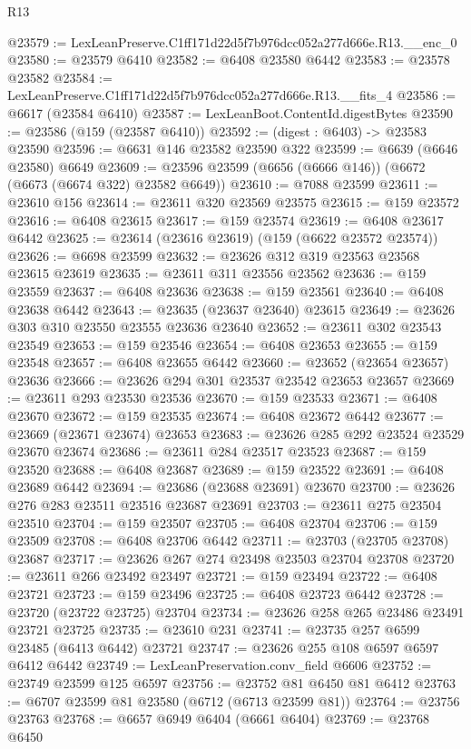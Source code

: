 \begin{lexlean}{R13}
\begin{coremodule}
@23579 := LexLeanPreserve.C1ff171d22d5f7b976dcc052a277d666e.R13.__enc_0
@23580 := @23579 @6410
@23582 := @6408 @23580 @6442
@23583 := @23578 @23582
@23584 := LexLeanPreserve.C1ff171d22d5f7b976dcc052a277d666e.R13.__fits_4
@23586 := @6617 (@23584 @6410)
@23587 := LexLeanBoot.ContentId.digestBytes
@23590 := @23586 (@159 (@23587 @6410))
@23592 := (digest : @6403) -> @23583 @23590
@23596 := @6631 @146 @23582 @23590 @322
@23599 := @6639 (@6646 @23580) @6649
@23609 := @23596 @23599 (@6656 (@6666 @146)) (@6672 (@6673 (@6674 @322) @23582 @6649))
@23610 := @7088 @23599
@23611 := @23610 @156
@23614 := @23611 @320 @23569 @23575
@23615 := @159 @23572
@23616 := @6408 @23615
@23617 := @159 @23574
@23619 := @6408 @23617 @6442
@23625 := @23614 (@23616 @23619) (@159 (@6622 @23572 @23574))
@23626 := @6698 @23599
@23632 := @23626 @312 @319 @23563 @23568 @23615 @23619
@23635 := @23611 @311 @23556 @23562
@23636 := @159 @23559
@23637 := @6408 @23636
@23638 := @159 @23561
@23640 := @6408 @23638 @6442
@23643 := @23635 (@23637 @23640) @23615
@23649 := @23626 @303 @310 @23550 @23555 @23636 @23640
@23652 := @23611 @302 @23543 @23549
@23653 := @159 @23546
@23654 := @6408 @23653
@23655 := @159 @23548
@23657 := @6408 @23655 @6442
@23660 := @23652 (@23654 @23657) @23636
@23666 := @23626 @294 @301 @23537 @23542 @23653 @23657
@23669 := @23611 @293 @23530 @23536
@23670 := @159 @23533
@23671 := @6408 @23670
@23672 := @159 @23535
@23674 := @6408 @23672 @6442
@23677 := @23669 (@23671 @23674) @23653
@23683 := @23626 @285 @292 @23524 @23529 @23670 @23674
@23686 := @23611 @284 @23517 @23523
@23687 := @159 @23520
@23688 := @6408 @23687
@23689 := @159 @23522
@23691 := @6408 @23689 @6442
@23694 := @23686 (@23688 @23691) @23670
@23700 := @23626 @276 @283 @23511 @23516 @23687 @23691
@23703 := @23611 @275 @23504 @23510
@23704 := @159 @23507
@23705 := @6408 @23704
@23706 := @159 @23509
@23708 := @6408 @23706 @6442
@23711 := @23703 (@23705 @23708) @23687
@23717 := @23626 @267 @274 @23498 @23503 @23704 @23708
@23720 := @23611 @266 @23492 @23497
@23721 := @159 @23494
@23722 := @6408 @23721
@23723 := @159 @23496
@23725 := @6408 @23723 @6442
@23728 := @23720 (@23722 @23725) @23704
@23734 := @23626 @258 @265 @23486 @23491 @23721 @23725
@23735 := @23610 @231
@23741 := @23735 @257 @6599 @23485 (@6413 @6442) @23721
@23747 := @23626 @255 @108 @6597 @6597 @6412 @6442
@23749 := LexLeanPreservation.conv_field @6606
@23752 := @23749 @23599 @125 @6597
@23756 := @23752 @81 @6450 @81 @6412
@23763 := @6707 @23599 @81 @23580 (@6712 (@6713 @23599 @81))
@23764 := @23756 @23763
@23768 := @6657 @6949 @6404 (@6661 @6404)
@23769 := @23768 @6450

\end{coremodule}
\end{lexlean}
